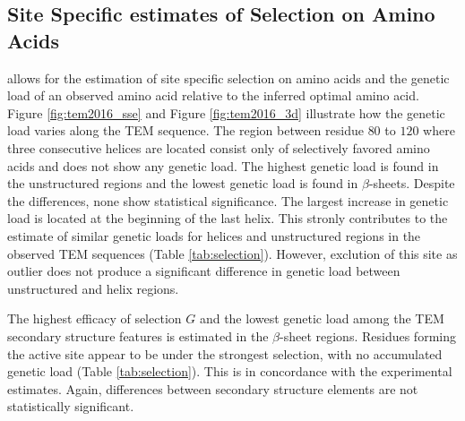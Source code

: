 \documentclass[12pt]{article}
\begin{document}
\subsection*{Site Specific estimates of Selection on Amino Acids}
\selac allows for the estimation of site specific selection on amino acids and the genetic load of an observed amino acid relative to the inferred optimal amino acid.
Figure \ref{fig:tem2016_sse} and Figure \ref{fig:tem2016_3d} illustrate how the genetic load varies along the TEM sequence.
The region between residue $80$ to $120$ where three consecutive helices are located consist only of selectively favored amino acids and does not show any genetic load. 
The highest genetic load is found in the unstructured regions and the lowest genetic load is found in $\beta$-sheets.
Despite the differences, none show statistical significance.
The largest increase in genetic load is located at the beginning of the last helix.
This stronly contributes to the estimate of similar genetic loads for helices and unstructured regions in the observed TEM sequences (Table \ref{tab:selection}).
However, exclution of this site as outlier does not produce a significant difference in genetic load between unstructured and helix regions.

The highest efficacy of selection $G$ and the lowest genetic load among the TEM secondary structure features is estimated in the $\beta$-sheet regions.
Residues forming the active site appear to be under the strongest selection, with no accumulated genetic load (Table \ref{tab:selection}).
This is in concordance with the experimental estimates.
Again, differences between secondary structure elements are not statistically significant.
\end{document}
